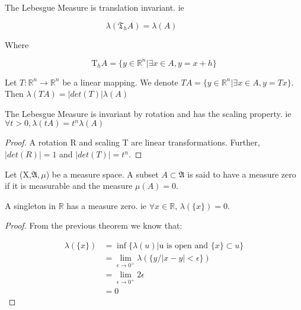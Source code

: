\begin{leftbar}
\begin{prop}
	The Lebesgue Measure is translation invariant. ie
	
	\[
	\lambda(\mathfrak{T}_{h}A) = \lambda(A)\hspace{3em}
	\]
	
	Where
	
	\[
	\textrm{T}_{h}A = \{y\in\mathbb{R}^{n} | \exists x\in A, y=x+h \}
	\]
\end{prop}
\end{leftbar}

\begin{leftbar}
\begin{prop}
	Let $T:\mathbb{R}^{n}\rightarrow\mathbb{R}^{n}$ be a linear mapping. We denote $TA = \{y\in\mathbb{R}^{n} | \exists x\in A, y=Tx \}$. Then $\lambda(TA)=|det(T)|\lambda(A)$
\end{prop}
\end{leftbar}

\begin{leftbar}
\begin{corollary}
	The Lebesgue Measure is invariant by rotation and has the scaling property. ie $\forall t>0, \lambda(tA) = t^{n}\lambda(A)$
\end{corollary}
\end{leftbar}

\begin{proof}
	A rotation R and scaling T are linear transformations. Further, $|det(R)|=1$ and $|det(T)|=t^{n}$.
\end{proof}

\begin{leftbar}
\begin{define}
	Let (X,$\mathfrak{A},\mu$) be a measure space. A subset $A\subset \mathfrak{A}$ is said to have a measure zero if it is measurable and the measure $\mu(A)=0$.
\end{define}
\end{leftbar}

\begin{leftbar}
\begin{prop}
	A singleton in $\mathbb{R}$ has a measure zero. ie $\forall x\in\mathbb{R}$, $\lambda(\{x\})=0$.
\end{prop}
\end{leftbar}

\begin{proof}
	From the previous theorem we know that:
	
	\[
	\begin{aligned}
	\lambda(\{x\}) &= \inf\{\lambda(u) | \text{u is open and } \{x\}\subset u\}\\
	               &= \lim_{\epsilon\rightarrow0^{+}}\lambda(\{y/ |x-y|<\epsilon \})\\
	               &= \lim_{\epsilon\rightarrow0^{+}}2\epsilon\\
	               &= 0
	\end{aligned}
	\]
\end{proof}


